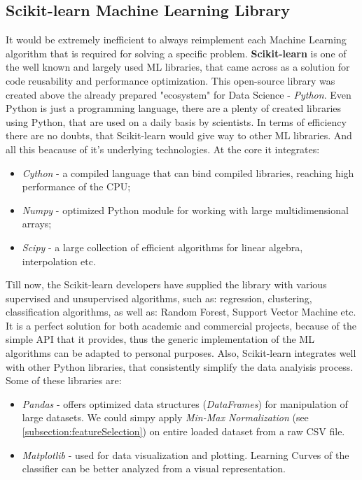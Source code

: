 \subsection{Scikit-learn Machine Learning Library}
It would be extremely inefficient to always reimplement each Machine Learning algorithm that is required for solving a specific problem. \textbf{Scikit-learn} is one of the well known and largely used ML libraries, that came across as a solution for code reusability and performance optimization. This open-source library was created above the already prepared "ecosystem" for Data Science - \textit{Python}. Even Python is just a programming language, there are a plenty of created libraries using Python, that are used on a daily basis by scientists. In terms of efficiency there are no doubts, that Scikit-learn would give way to other ML libraries. And all this beacause of it's underlying technologies. At the core it integrates:

\begin{itemize}
	\item \textit{Cython} - a compiled language that can bind compiled libraries, reaching high performance of the CPU;
	\item \textit{Numpy} - optimized Python module for working with large multidimensional arrays;
	\item \textit{Scipy} - a large collection of efficient algorithms for linear algebra, interpolation etc.
\end{itemize}

Till now, the Scikit-learn developers have supplied the library with various supervised and unsupervised algorithms, such as: regression, clustering, classification algorithms, as well as: Random Forest, Support Vector Machine etc. It is a perfect solution for both academic and commercial projects, because of the simple API that it provides, thus the generic implementation of the ML algorithms can be adapted to personal purposes. Also, Scikit-learn integrates well with other Python libraries, that consistently simplify the data analyisis process. Some of these libraries are: 

\begin{itemize}
	\item \textit{Pandas} - offers optimized data structures (\textit{DataFrames}) for manipulation of large datasets. We could simpy apply \textit{Min-Max Normalization} (see \ref{subsection:featureSelection}) on entire loaded dataset from a raw CSV file.
	\item \textit{Matplotlib} - used for data visualization and plotting. Learning Curves of the classifier can be better analyzed from a visual representation.
\end{itemize}


